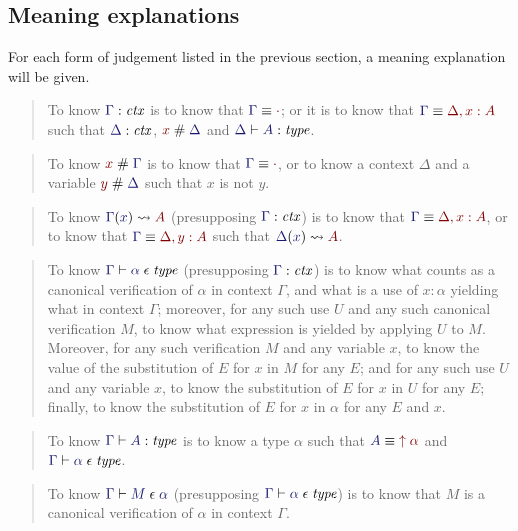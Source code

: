 \documentclass[main.tex]{subfiles}
\begin{document}
\subsection{Meaning explanations}

For each form of judgement listed in the previous section, a meaning
explanation will be given.

\begin{quote}
  To know $\lfctx\Gamma$ is to know that $\match{\Gamma}{\cdot}$; or it is
to know that $\match{\Gamma}{\Delta,x:A}$ such that $\lfctx\Delta$, $\fresh{x}{\Delta}$ and
$\lfsequent\Delta\type{A}$.
\end{quote}\medskip

\begin{quote}
  To know $\fresh{x}{\Gamma}$ is to know that $\match\Gamma\cdot$, or
to know a context $\Delta$ and a variable $\fresh{y}{\Delta}$ such
that $x$ is not $y$.
\end{quote}\medskip

\begin{quote}
  To know $\hasvar{\Gamma}{x}{A}$ (presupposing $\lfctx\Gamma$) is to
know that $\match{\Gamma}{\Delta,x:A}$, or to know that
$\match{\Gamma}{\Delta, y:A}$ such that $\hasvar{\Delta}{x}{A}$.
\end{quote}\medskip

\begin{quote}
  To know $\lfsequent\Gamma\cantype{\alpha}$ (presupposing $\lfctx\Gamma$) is
to know what counts as a canonical verification of $\alpha$ in context
$\Gamma$, and what is a use of $x:\alpha$ yielding what in context
$\Gamma$; moreover, for any such use $U$ and any such canonical
verification $M$, to know what expression is yielded by applying $U$
to $M$. Moreover, for any such verification $M$ and any variable $x$,
to know the value of the substitution of $E$ for $x$ in $M$ for any
$E$; and for any such use $U$ and any variable $x$, to know the
substitution of $E$ for $x$ in $U$ for any $E$; finally, to know the
substitution of $E$ for $x$ in $\alpha$ for any $E$ and $x$.
\end{quote}\medskip

\begin{quote}
  To know $\lfsequent\Gamma\type{A}$ is to know a type $\alpha$ such that $\match{A}{\ival{\alpha}}$ and $\lfsequent\Gamma\cantype\alpha$.
\end{quote}\medskip

\begin{quote}
  To know $\lfsequent\Gamma\valof{M}{\alpha}$ (presupposing
$\lfsequent\Gamma\cantype{\alpha}$) is to know that $M$ is a canonical
verification of $\alpha$ in context $\Gamma$. 
\end{quote}\medskip
\end{document}
